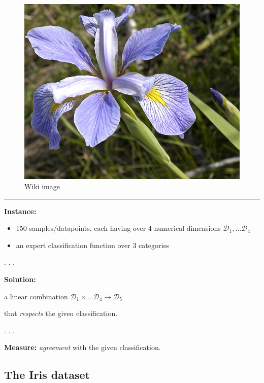 \documentclass[
  letterpaper,
  DIV=11,
  numbers=noendperiod]{scrartcl}
\begin{document}
\begin{figure}[H]

{\centering \includegraphics{2d_visualisation_files/mediabag/675px-Iris_virginica.jpg}

}

\caption{Wiki image}

\end{figure}%

\begin{center}\rule{0.5\linewidth}{0.5pt}\end{center}

\textbf{Instance:}

\begin{itemize}
\item
  150 samples/datapoints, each having over 4 numerical dimensions
  \(\mathcal{D_1,} \dots \mathcal{D_{4}}\)
\item
  an expert classification function over 3 categories
\end{itemize}

. . .

\textbf{Solution:}

a linear combination
\(\mathcal{D_1} \times \dots \mathcal{D_{4}}\rightarrow \mathcal{D_5}\)

that \emph{respects} the given classification.

. . .

\textbf{Measure:} \emph{agreement} with the given classification.

\subsection{The Iris dataset}\label{the-iris-dataset}
\end{document}
